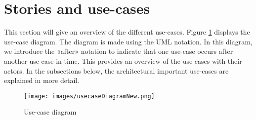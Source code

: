 

\clearpage


\section{Stories and use-cases}
This section will give an overview of the different use-cases. Figure \ref{fig:usecase-diagram} displays the use-case diagram. The diagram is made using the UML notation. In this diagram, we introduce the «after» notation to indicate that one use-case occurs after another use case in time. This provides an overview of the use-cases with their actors. In the subsections below, the architectural important use-cases are explained in more detail.

\begin{figure}[H]
	\centering
	\texttt{[image: images/usecaseDiagramNew.png]}
	\caption{Use-case diagram}
	\label{fig:usecase-diagram}
\end{figure}





\clearpage
